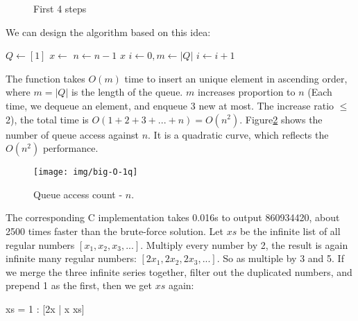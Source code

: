 \documentclass[b5paper]{article}
\begin{document}
\begin{figure}[htbp]
  \centering
  \caption{First 4 steps}
  \label{fig:queues}
\end{figure}

We can design the algorithm based on this idea:

\begin{algorithmic}[1]
  \State $Q \gets [1]$
    \State $x \gets$ 
    \State {}
    \State {}
    \State {}
    \State $n \gets n-1$
  \EndWhile
  \State \Return $x$
\EndFunction
\Statex
{}
  \State $i \gets 0, m \gets |Q|$
    \State $i \gets i + 1$
  \EndWhile
    \State {}
  \EndIf
\EndFunction
\end{algorithmic}

The  function takes $O(m)$ time to insert an unique element in ascending order, where $m = |Q|$ is the length of the queue. $m$ increases proportion to $n$ (Each time, we dequeue an element, and enqueue 3 new at most. The increase ratio $\leq$ 2), the total time is $O(1 + 2 + 3 + ... + n) = O(n^2)$. Figure\ref{fig:big-O-1q} shows the number of queue access against $n$. It is a quadratic curve, which reflects the $O(n^2)$ performance.

\begin{figure}[htbp]
  \centering
  \texttt{[image: img/big-O-1q]}
  \caption{Queue access count - $n$.}
  \label{fig:big-O-1q}
\end{figure}

The corresponding C implementation takes 0.016s to output 860934420, about 2500 times faster than the brute-force solution. Let $xs$ be the infinite list of all regular numbers $[x_1, x_2, x_3, ...]$. Multiply every number by 2, the result is again infinite many regular numbers: $[2x_1, 2x_2, 2x_3, ...]$. So as multiple by 3 and 5. If we merge the three infinite series together, filter out the duplicated numbers, and prepend 1 as the first, then we get $xs$ again:

\be
  xs = 1 : [2x | x \gets xs] \cup [3x | x \gets xs] \cup [5x | x \gets xs]
\ee
\end{document}
